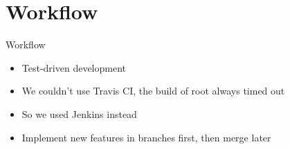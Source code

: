\section{Workflow}

\begin{frame}{Workflow}
\begin{itemize}
	\item Test-driven development
	\item We couldn't use Travis CI, the build of root always timed out
	\item So we used Jenkins instead
	\item Implement new features in branches first, then merge later
\end{itemize}
\end{frame}
